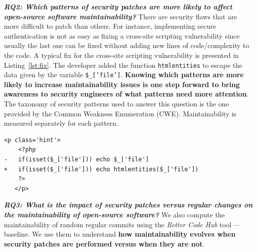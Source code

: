 \documentclass[10pt,conference]{IEEEtran}
\newcounter{lstannotation}
\begin{document}
\textit{\textbf{RQ2: Which patterns of security patches are more likely to
affect open-source software maintainability?}}
There are security flaws that are more difficult to patch than others. For
instance, implementing secure authentication is not as easy as fixing a
cross-site scripting vulnerability since usually the last one can be fixed
without adding new lines of code/complexity to the code. A typical fix for 
the cross-site scripting vulnerability is presented in Listing~\ref{lst:fix}. The developer added the function \texttt{htmlentities} to escape the data given by the variable
\texttt{\$\_['file']}. \textbf{Knowing which patterns are more likely to increase
maintainability issues is one step forward to bring awareness to security
engineers of what patterns need more attention}. The taxonomy of security
patterns used to answer this question is the one provided by the Common Weakness Enumeration
(CWE). Maintainability is measured
separately for each pattern.
%
\setcounter{lstannotation}{0}
\begin{lstlisting}[style={PHPStyle}, caption={Fix provided by \texttt{nextcloud/server} developers to a \\Cross-Site Scripting vulnerability},label={lst:fix}]
   <p class='hint'>
    <?php
-   if(isset($_['file'])) echo $_['file']
+   if(isset($_['file'])) echo htmlentities($_['file'])
    ?>
   </p>
\end{lstlisting}
%
\textit{\textbf{RQ3: What is the impact of security patches versus regular changes on the
maintainability of open-source software?}}
%
We also compute the maintainability of random regular commits using the
\emph{Better Code Hub} tool --- baseline.  We use them to understand \textbf{how
maintainability evolves when security patches are performed versus when
they are not}.
%
\end{document}
